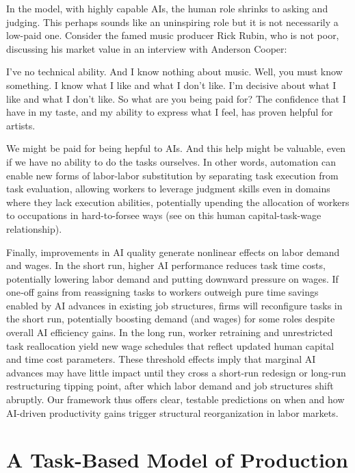 \documentclass{article}
\theoremstyle{plain}
\theoremstyle{plain}
\begin{document}
In the model, with highly capable AIs, the human role shrinks to asking and judging. 
This perhaps sounds like an uninspiring role but it is not necessarily a low-paid one. 
Consider the famed music producer Rick Rubin, who is not poor, discussing his market value in an interview with Anderson Cooper:
\begin{dialogue}
     I've no technical ability. And I know nothing about music.
     Well, you must know something.
     I know what I like and what I don't like. I'm decisive about what I like and what I don't like.
     So what are you being paid for?
     The confidence that I have in my taste, and my ability to express what I feel, has proven helpful for artists.
\end{dialogue}
We might be paid for being hepful to AIs.
And this help might be valuable, even if we have no ability to do the tasks ourselves.
In other words, automation can enable new forms of labor-labor substitution by separating task execution from task evaluation, allowing workers to leverage judgment skills even in domains where they lack execution abilities, potentially upending the allocation of workers to occupations in hard-to-forsee ways (see \cite{autor2013putting} on this human capital-task-wage relationship).

Finally, improvements in AI quality generate nonlinear effects on labor demand and wages.
In the short run, higher AI performance reduces task time costs, potentially lowering labor demand and putting downward pressure on wages.
If one‐off gains from reassigning tasks to workers outweigh pure time savings enabled by AI advances in existing job structures, firms will reconfigure tasks in the short run, potentially boosting demand (and wages) for some roles despite overall AI efficiency gains.
In the long run, worker retraining and unrestricted task reallocation yield new wage schedules that reflect updated human capital and time cost parameters.  
These threshold effects imply that marginal AI advances may have little impact until they cross a short‐run redesign or long‐run restructuring tipping point, after which labor demand and job structures shift abruptly.  
Our framework thus offers clear, testable predictions on when and how AI-driven productivity gains trigger structural reorganization in labor markets.



\section{A Task-Based Model of Production}
\label{sec:taskbased_prod}
\end{document}

